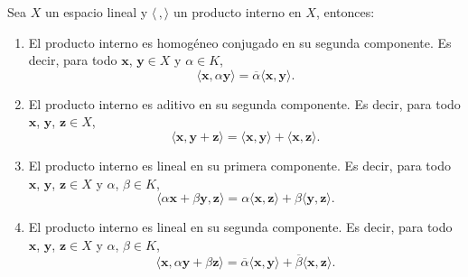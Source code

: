 \begin{prop}{}{}
    Sea $X$ un espacio lineal y $\langle \, , \rangle$ un producto interno en $X$, entonces:
    \begin{enumerate}[label=\roman*), topsep=6pt, itemsep=0pt]
        \item El producto interno es homogéneo conjugado en su segunda componente. Es decir, para todo $\mathbf{x}$, $\mathbf{y} \in X$ y $\alpha \in K$,
        $$\langle \mathbf{x}, \alpha \mathbf{y} \rangle = \overline{\alpha} \langle \mathbf{x}, \mathbf{y} \rangle.$$
        \item El producto interno es aditivo en su segunda componente. Es decir, para todo $\mathbf{x}$, $\mathbf{y}$, $\mathbf{z} \in X$,
        $$\langle \mathbf{x}, \mathbf{y} + \mathbf{z} \rangle = \langle \mathbf{x}, \mathbf{y} \rangle + \langle \mathbf{x}, \mathbf{z} \rangle.$$
        \item El producto interno es lineal en su primera componente. Es decir, para todo $\mathbf{x}$, $\mathbf{y}$, $\mathbf{z} \in X$ y $\alpha$, $\beta \in K$,
        $$\langle \alpha \mathbf{x} + \beta \mathbf{y}, \mathbf{z} \rangle = \alpha \langle \mathbf{x}, \mathbf{z} \rangle + \beta \langle \mathbf{y}, \mathbf{z} \rangle.$$
        \item El producto interno es lineal en su segunda componente. Es decir, para todo $\mathbf{x}$, $\mathbf{y}$, $\mathbf{z} \in X$ y $\alpha$, $\beta \in K$,
        $$\langle \mathbf{x}, \alpha \mathbf{y} + \beta \mathbf{z} \rangle = \overline{\alpha} \langle \mathbf{x}, \mathbf{y} \rangle + \overline{\beta} \langle \mathbf{x}, \mathbf{z} \rangle.$$
    \end{enumerate}
    

\end{prop}
